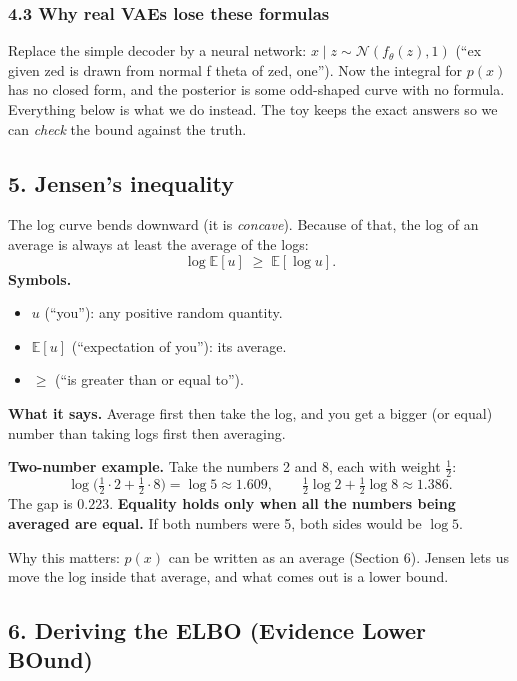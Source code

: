 \subsubsection*{4.3 Why real VAEs lose these formulas}

Replace the simple decoder by a neural network: $x \mid z \sim \mathcal{N}(f_\theta(z), 1)$ (``ex given zed is drawn from normal f theta of zed, one''). Now the integral for $p(x)$ has no closed form, and the posterior is some odd-shaped curve with no formula. Everything below is what we do instead. The toy keeps the exact answers so we can \emph{check} the bound against the truth.

\subsection*{5. Jensen's inequality}

The log curve bends downward (it is \emph{concave}). Because of that, the log of an average is always at least the average of the logs:
\[
\log \mathbb{E}[u] \;\ge\; \mathbb{E}[\log u].
\]
\textbf{Symbols.}
\begin{itemize}[leftmargin=1.5em, itemsep=0pt]
\item $u$ (``you''): any positive random quantity.
\item $\mathbb{E}[u]$ (``expectation of you''): its average.
\item $\ge$ (``is greater than or equal to'').
\end{itemize}
\textbf{What it says.} Average first then take the log, and you get a bigger (or equal) number than taking logs first then averaging.

\textbf{Two-number example.} Take the numbers 2 and 8, each with weight $\tfrac12$:
\[
\log\Big(\tfrac{1}{2}\cdot 2 + \tfrac{1}{2}\cdot 8\Big) = \log 5 \approx 1.609,
\qquad
\tfrac{1}{2}\log 2 + \tfrac{1}{2}\log 8 \approx 1.386.
\]
The gap is $0.223$. \textbf{Equality holds only when all the numbers being averaged are equal.} If both numbers were 5, both sides would be $\log 5$.

Why this matters: $p(x)$ can be written as an average (Section 6). Jensen lets us move the log inside that average, and what comes out is a lower bound.

\subsection*{6. Deriving the ELBO (Evidence Lower BOund)}

